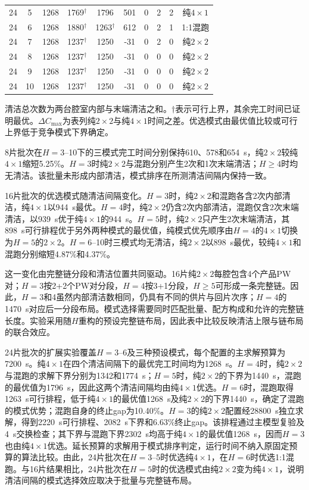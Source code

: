 \documentclass[final,5p,times,twocolumn]{elsarticle}
\begin{document}
\begin{table}[tp]
\begin{tabular}{cccccccccc}
24 & 5 & 1268 & 1769$^{\dagger}$ & 1796 & 501 & 0 & 2 & 2 & 纯$4\times1$\\
24 & 6 & 1268 & 1880$^{\dagger}$ & 1263$^{\dagger}$ & 612 & 0 & 2 & 1 & 1:1混跑\\
24 & 7 & 1268 & 1237$^{\dagger}$ & 1250 & -31 & 0 & 2 & 0 & 纯$2\times2$\\
24 & 8 & 1268 & 1237$^{\dagger}$ & 1250 & -31 & 0 & 0 & 0 & 纯$2\times2$\\
24 & 9 & 1268 & 1237$^{\dagger}$ & 1250 & -31 & 0 & 0 & 0 & 纯$2\times2$\\
24 & 10 & 1268 & 1237$^{\dagger}$ & 1250 & -31 & 0 & 0 & 0 & 纯$2\times2$\\
\bottomrule
\end{tabular}
\par\smallskip
\parbox{0.95\textwidth}{\footnotesize 清洁总次数为两台腔室内部与末端清洁之和。$\dagger$表示可行上界，其余完工时间已证明最优。$\Delta C_{\max}$为表列纯$2\times2$与纯$4\times1$时间之差。优选模式由最优值比较或可行上界低于竞争模式下界确定。}
\end{table}

8片批次在$H=3$--10下的三模式完工时间分别保持610、578和654~s，纯$2\times2$较纯$4\times1$缩短5.25\%。$H=3$时纯$2\times2$与混跑分别产生2次和1次末端清洁；$H\ge4$时均无清洁。该批量未形成内部清洁，模式排序在所测清洁间隔内保持一致。

16片批次的优选模式随清洁间隔变化。$H=3$时，纯$2\times2$和混跑各含2次内部清洁，纯$4\times1$以944~s最优。$H=4$时，纯$2\times2$仍含2次内部清洁，混跑仅含2次末端清洁，以939~s优于纯$4\times1$的944~s。$H=5$时，纯$2\times2$只产生2次末端清洁，其898~s可行排程优于另外两种模式的最优值，纯模式优先顺序由$H=4$的$4\times1$切换为$H=5$的$2\times2$。$H=6$--10时三模式均无清洁，纯$2\times2$以898~s最优，较纯$4\times1$和混跑分别缩短4.87\%和4.37\%。

这一变化由完整链分段和清洁位置共同驱动。16片纯$2\times2$每腔包含4个产品PW对；$H=3$按2+2个PW对分段，$H=4$按3+1分段，$H\ge5$可形成一条完整链。因此，$H=3$和4虽然内部清洁数相同，仍具有不同的供片与回片次序；$H=4$的1470~s对应后一分段布局。模式选择需要同时匹配批量、配方构成和允许的完整链长度。实验采用随$H$重构的预设完整链布局，因此表中比较反映清洁上限与链布局的联合效应。

24片批次的扩展实验覆盖$H=3$--6及三种预设模式，每个配置的主求解预算为7200~s。纯$4\times1$在四个清洁间隔下的最优完工时间均为1268~s。$H=4$时，纯$2\times2$与混跑的求解下界分别为1342和1774~s；$H=5$时，纯$2\times2$的下界为1440~s，混跑的最优值为1796~s，因此这两个清洁间隔均由纯$4\times1$优选。$H=6$时，混跑取得1263~s可行排程，低于纯$4\times1$的最优值1268~s及纯$2\times2$的下界1440~s，确定了混跑的模式优势；混跑自身的终止gap为10.40\%。$H=3$的纯$2\times2$配置经28800~s独立求解，得到2220~s可行排程、2082~s下界和6.63\%终止gap。该排程通过主模型复验及4~s交换检查；其下界与混跑下界2302~s均高于纯$4\times1$的最优值1268~s，因而$H=3$也由纯$4\times1$优选。延长预算的求解用于模式排序判定，运行时间不纳入原固定预算的算法比较。由此，24片批次在$H=3$--5时优选纯$4\times1$，在$H=6$时优选1:1混跑。与16片结果相比，24片批次在$H=5$时的优选模式由纯$2\times2$变为纯$4\times1$，说明清洁间隔的模式选择效应取决于批量与完整链布局。
\end{document}
